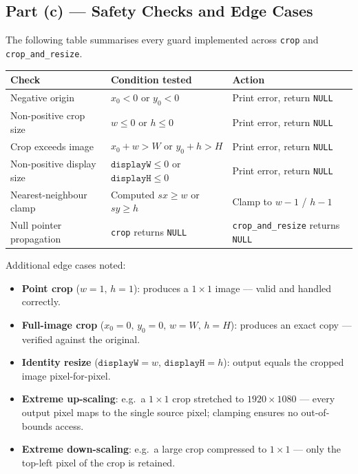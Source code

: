 \documentclass[12pt,a4paper]{article}
\begin{document}
\subsection{Part (c) — Safety Checks and Edge Cases}
\label{sec:safety}

The following table summarises every guard implemented across
\texttt{crop} and \texttt{crop\_and\_resize}.

\begin{center}
\begin{tabular}{@{}lll@{}}
    \toprule
    \textbf{Check} & \textbf{Condition tested} & \textbf{Action} \\
    \midrule
    Negative origin
        & \(x_0 < 0\) or \(y_0 < 0\)
        & Print error, return \texttt{NULL} \\
    Non-positive crop size
        & \(w \le 0\) or \(h \le 0\)
        & Print error, return \texttt{NULL} \\
    Crop exceeds image
        & \(x_0 + w > W\) or \(y_0 + h > H\)
        & Print error, return \texttt{NULL} \\
    Non-positive display size
        & \(\texttt{displayW} \le 0\) or \(\texttt{displayH} \le 0\)
        & Print error, return \texttt{NULL} \\
    Nearest-neighbour clamp
        & Computed \(sx \ge w\) or \(sy \ge h\)
        & Clamp to \(w-1\) / \(h-1\) \\
    Null pointer propagation
        & \texttt{crop} returns \texttt{NULL}
        & \texttt{crop\_and\_resize} returns \texttt{NULL} \\
    \bottomrule
\end{tabular}
\end{center}

Additional edge cases noted:

\begin{itemize}
    \item \textbf{Point crop} (\(w = 1,\, h = 1\)): produces a
          \(1 \times 1\) image — valid and handled correctly.
    \item \textbf{Full-image crop} (\(x_0 = 0,\, y_0 = 0,\, w = W,\, h = H\)):
          produces an exact copy — verified against the original.
    \item \textbf{Identity resize} (\(\texttt{displayW} = w,\,
          \texttt{displayH} = h\)): output equals the cropped image
          pixel-for-pixel.
    \item \textbf{Extreme up-scaling}: e.g.\ a \(1 \times 1\) crop stretched
          to \(1920 \times 1080\) — every output pixel maps to the single source
          pixel; clamping ensures no out-of-bounds access.
    \item \textbf{Extreme down-scaling}: e.g.\ a large crop compressed to
          \(1 \times 1\) — only the top-left pixel of the crop is retained.
\end{itemize}
\end{document}
